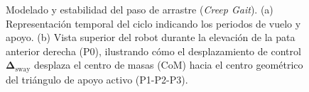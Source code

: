 \begin{figure}[htbp]
\caption{Modelado y estabilidad del paso de arrastre (\textit{Creep Gait}). (a) Representación temporal del ciclo indicando los periodos de vuelo y apoyo. (b) Vista superior del robot durante la elevación de la pata anterior derecha (P0), ilustrando cómo el desplazamiento de control $\boldsymbol{\Delta}_{\text{sway}}$ desplaza el centro de masas (CoM) hacia el centro geométrico del triángulo de apoyo activo (P1-P2-P3).}
\label{fig:creep_gait_model}
\end{figure}
